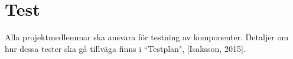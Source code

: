 \section{Test}
Alla projektmedlemmar ska ansvara för testning av komponenter. Detaljer om hur dessa tester ska gå tillväga finns i ``Testplan", [Isaksson, 2015].
